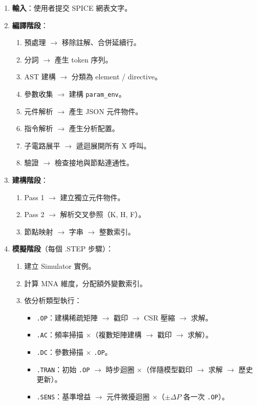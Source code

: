 \documentclass[12pt,a4paper]{article}
\begin{document}
\begin{enumerate}
  \item \textbf{輸入}：使用者提交 SPICE 網表文字。

  \item \textbf{編譯階段}：
  \begin{enumerate}[label=\arabic{enumi}.\arabic*]
    \item 預處理 $\rightarrow$ 移除註解、合併延續行。
    \item 分詞 $\rightarrow$ 產生 token 序列。
    \item AST 建構 $\rightarrow$ 分類為 element / directive。
    \item 參數收集 $\rightarrow$ 建構 \texttt{param\_env}。
    \item 元件解析 $\rightarrow$ 產生 JSON 元件物件。
    \item 指令解析 $\rightarrow$ 產生分析配置。
    \item 子電路展平 $\rightarrow$ 遞迴展開所有 X 呼叫。
    \item 驗證 $\rightarrow$ 檢查接地與節點連通性。
  \end{enumerate}

  \item \textbf{建構階段}：
  \begin{enumerate}[label=\arabic{enumi}.\arabic*]
    \item Pass 1 $\rightarrow$ 建立獨立元件物件。
    \item Pass 2 $\rightarrow$ 解析交叉參照（K, H, F）。
    \item 節點映射 $\rightarrow$ 字串 $\rightarrow$ 整數索引。
  \end{enumerate}

  \item \textbf{模擬階段}（每個 .STEP 步驟）：
  \begin{enumerate}[label=\arabic{enumi}.\arabic*]
    \item 建立 Simulator 實例。
    \item 計算 MNA 維度，分配額外變數索引。
    \item 依分析類型執行：
    \begin{itemize}
      \item \texttt{.OP}：建構稀疏矩陣 $\rightarrow$ 戳印 $\rightarrow$ CSR 壓縮 $\rightarrow$ 求解。
      \item \texttt{.AC}：頻率掃描 $\times$（複數矩陣建構 $\rightarrow$ 戳印 $\rightarrow$ 求解）。
      \item \texttt{.DC}：參數掃描 $\times$ \texttt{.OP}。
      \item \texttt{.TRAN}：初始 \texttt{.OP} $\rightarrow$ 時步迴圈 $\times$（伴隨模型戳印 $\rightarrow$ 求解 $\rightarrow$ 歷史更新）。
      \item \texttt{.SENS}：基準增益 $\rightarrow$ 元件微擾迴圈 $\times$（$\pm\Delta P$ 各一次 \texttt{.OP}）。
    \end{itemize}
  \end{enumerate}


\end{enumerate}
\end{document}
